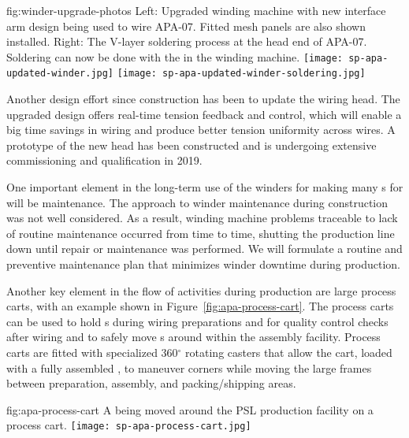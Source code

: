 \begin{dunefigure}{fig:winder-upgrade-photos}
{Left: Upgraded winding machine with new interface arm design being used to wire APA-07. Fitted mesh panels are also shown installed. Right: The V-layer soldering process at the head end of APA-07. Soldering can now be done with the  in the winding machine.}
\texttt{[image: sp-apa-updated-winder.jpg]} 
\texttt{[image: sp-apa-updated-winder-soldering.jpg]}
\end{dunefigure}

Another design effort since  construction has been to update the wiring head. The upgraded design offers real-time tension feedback and control, which will enable a big time savings in wiring and produce better tension uniformity across wires.  A prototype of the new head has been constructed and is undergoing extensive commissioning and qualification in 2019.   %

One important element in the long-term use of the winders for making many s for  will be maintenance.  The approach to winder maintenance during  construction was not well considered. As a result, winding machine problems traceable to lack of routine maintenance occurred from time to time, shutting the production line down until repair or maintenance was performed. We will formulate a routine and preventive maintenance plan that minimizes winder downtime during  production.

Another key element in the flow of activities during production are large process carts, with an example shown in Figure~\ref{fig:apa-process-cart}. The process carts can be used to hold s during wiring preparations and for quality control checks after wiring and to safely move s around within the assembly facility. Process carts are fitted with specialized 360$^\circ$ rotating casters that allow the cart, loaded with a fully assembled , to maneuver corners while moving the large frames between preparation, assembly, and packing/shipping areas.

\begin{dunefigure}{fig:apa-process-cart}
{A   being moved around the PSL production facility on a process cart.}
\texttt{[image: sp-apa-process-cart.jpg]}
\end{dunefigure}



